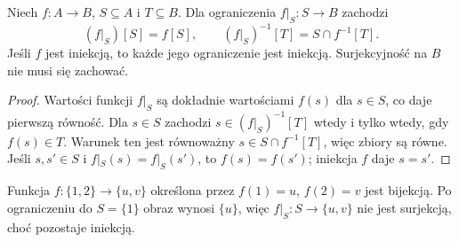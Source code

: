 \begin{twierdzenie}\label{thm:restriction-images-xliv}
Niech $f:A\to B$, $S\subseteq A$ i $T\subseteq B$.
Dla ograniczenia $f|_S:S\to B$ zachodzi
\[
 (f|_S)[S]=f[S],\qquad
 (f|_S)^{-1}[T]=S\cap f^{-1}[T].
\]
Jeśli $f$ jest iniekcją, to każde jego ograniczenie
jest iniekcją. Surjekcyjność na $B$ nie musi się zachować.
\end{twierdzenie}
\begin{proof}
Wartości funkcji $f|_S$ są dokładnie wartościami
$f(s)$ dla $s\in S$, co daje pierwszą równość.
Dla $s\in S$ zachodzi $s\in(f|_S)^{-1}[T]$
wtedy i tylko wtedy, gdy $f(s)\in T$.
Warunek ten jest równoważny $s\in S\cap f^{-1}[T]$,
więc zbiory są równe. Jeśli $s,s'\in S$ i
$f|_S(s)=f|_S(s')$, to $f(s)=f(s')$; iniekcja
$f$ daje $s=s'$.
\end{proof}
\begin{przyklad}
Funkcja $f:\{1,2\}\to\{u,v\}$ określona przez
$f(1)=u$, $f(2)=v$ jest bijekcją.
Po ograniczeniu do $S=\{1\}$ obraz wynosi $\{u\}$,
więc $f|_S:S\to\{u,v\}$ nie jest surjekcją,
choć pozostaje iniekcją.
\end{przyklad}

